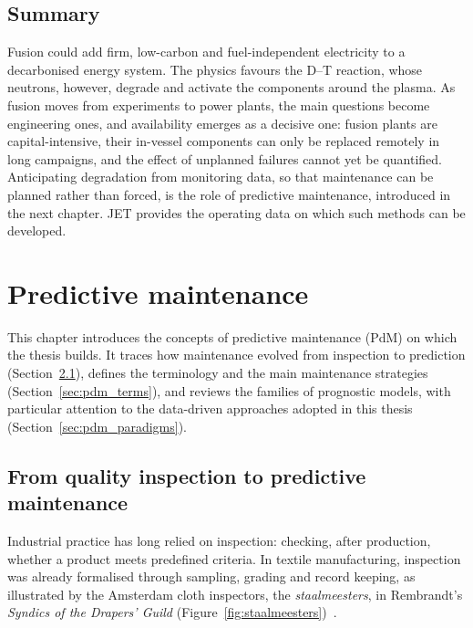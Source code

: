 \documentclass{book}
\begin{document}
\section{Summary}
\label{sec:fusion_summary}

Fusion could add firm, low-carbon and fuel-independent electricity to a
decarbonised energy system. The physics favours the D--T reaction, whose
neutrons, however, degrade and activate the components around the plasma. As
fusion moves from experiments to power plants, the main questions become
engineering ones, and availability emerges as a decisive one: fusion plants
are capital-intensive, their in-vessel components can only be replaced
remotely in long campaigns, and the effect of unplanned failures cannot yet be
quantified. Anticipating degradation from monitoring data, so that
maintenance can be planned rather than forced, is the role of predictive
maintenance, introduced in the next chapter. JET provides the operating data
on which such methods can be developed.

\chapter{Predictive maintenance}
\label{ch:pdm}

This chapter introduces the concepts of predictive maintenance (PdM) on which
the thesis builds. It traces how maintenance evolved from inspection to
prediction (Section~\ref{sec:pdm_history}), defines the terminology and the
main maintenance strategies (Section~\ref{sec:pdm_terms}), and reviews the
families of prognostic models, with particular attention to the data-driven
approaches adopted in this thesis (Section~\ref{sec:pdm_paradigms}).

\section{From quality inspection to predictive maintenance}
\label{sec:pdm_history}

Industrial practice has long relied on inspection: checking, after
production, whether a product meets predefined criteria. In textile
manufacturing, inspection was already formalised through sampling, grading and
record keeping, as illustrated by the Amsterdam cloth inspectors, the
\emph{staalmeesters}, in Rembrandt's \emph{Syndics of the Drapers' Guild}
(Figure~\ref{fig:staalmeesters})~\cite{Juran1995}.
\end{document}
